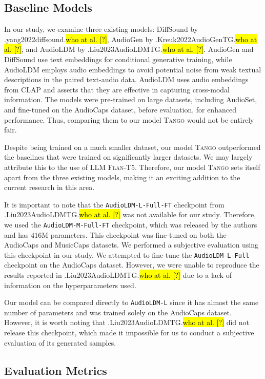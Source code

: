 \documentclass{article}
\newcommand{\model}{\textsc{Tango}}
\let\realcitet\citet
\renewcommand{\citet}[1]{\ifx.#1.\hl{who at al. [?]}\else\realcitet{#1}\fi}
\begin{document}
\subsection{Baseline Models}
In our study, we examine three existing models: DiffSound by \citet{yang2022diffsound}, AudioGen by \citet{Kreuk2022AudioGenTG}, and AudioLDM by \citet{Liu2023AudioLDMTG}. AudioGen and DiffSound use text embeddings for conditional generative training, while AudioLDM employs audio embeddings to avoid potential noise from weak textual descriptions in the paired text-audio data. AudioLDM uses audio embeddings from CLAP and asserts that they are effective in capturing cross-modal information. The models were pre-trained on large datasets, including AudioSet, and fine-tuned on the AudioCaps dataset, before evaluation, for enhanced performance. Thus, comparing them to our model \model{} would not be entirely fair.

Despite being trained on a much smaller dataset, our model \model{} outperformed the baselines that were trained on significantly larger datasets. We may largely attribute this to the use of LLM \textsc{Flan-T5}. Therefore, our model \model{} sets itself apart from the three existing models, making it an exciting addition to the current research in this area.

It is important to note that the \texttt{AudioLDM-L-Full-FT} checkpoint from \citet{Liu2023AudioLDMTG} was not available for our study. Therefore, we used the \texttt{AudioLDM-M-Full-FT} checkpoint, which was released by the authors and has $416$M parameters. This checkpoint was fine-tuned on both the AudioCaps and MusicCaps datasets. We performed a subjective evaluation using this checkpoint in our study. We attempted to fine-tune the \texttt{AudioLDM-L-Full} checkpoint on the AudioCaps dataset. However, we were unable to reproduce the results reported in \citet{Liu2023AudioLDMTG} due to a lack of information on the hyperparameters used.

Our model can be compared directly to \texttt{AudioLDM-L} since it has almost the same number of parameters and was trained solely on the AudioCaps dataset. However, it is worth noting that \citet{Liu2023AudioLDMTG} did not release this checkpoint, which made it impossible for us to conduct a subjective evaluation of its generated samples.
\subsection{Evaluation Metrics}
\end{document}
